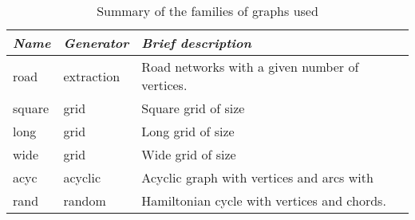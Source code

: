 \documentclass[11pt]{amsart}
\theoremstyle{plain}
\theoremstyle{remark}
\begin{document}
\begin{table}
\begin{center}
 	\begin{tabular}{|lll|}
 		\hline
 			\emph{Name} & \emph{Generator} & \emph{Brief description} \\
 		\hline
 			road & extraction	& Road networks with a given number of vertices. \\
 			\hline
 			square & grid & Square grid of size  \\
 			long & grid & Long grid of size  \\
 			wide & grid & Wide grid of size  \\
 			\hline
 			acyc & acyclic & Acyclic graph with  vertices  and  arcs  with  \\
\hline
 			rand & random &  			Hamiltonian cycle with  vertices and  chords. \\
\hline
 	\end{tabular}
\end{center}
	\caption{Summary of the families of graphs used}
	\label{tab:FamilyGraphs}
 \end{table} 
\end{document}
